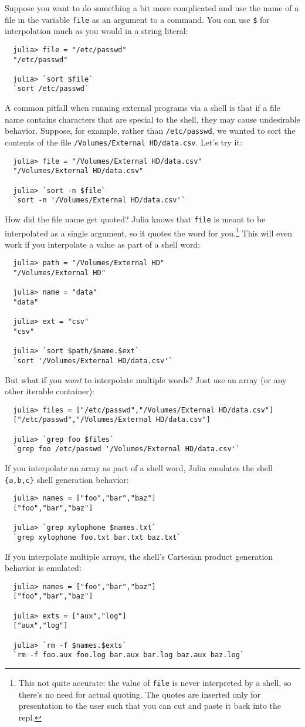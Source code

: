 \documentclass{article}
\begin{document}
Suppose you want to do something a bit more complicated and use the name of a file in the variable \verb|file| as an argument to a command.
You can use \verb|$| for interpolation much as you would in a string literal:
\begin{verbatim}
  julia> file = "/etc/passwd"
  "/etc/passwd"

  julia> `sort $file`
  `sort /etc/passwd`
\end{verbatim}
A common pitfall when running external programs via a shell is that if a file name contains characters that are special to the shell, they may cause undesirable behavior.
Suppose, for example, rather than \verb|/etc/passwd|, we wanted to sort the contents of the file \verb|/Volumes/External HD/data.csv|.
Let's try it:
\begin{verbatim}
  julia> file = "/Volumes/External HD/data.csv"
  "/Volumes/External HD/data.csv"

  julia> `sort -n $file`
  `sort -n '/Volumes/External HD/data.csv'`
\end{verbatim}
How did the file name get quoted?
Julia knows that \verb|file| is meant to be interpolated as a single argument, so it quotes the word for you.\footnote{This not quite accurate:
the value of \texttt{file} is never interpreted by a shell, so there's no need for actual quoting.
The quotes are inserted only for presentation to the user such that you can cut and paste it back into the repl.}
This will even work if you interpolate a value as part of a shell word:
\begin{verbatim}
  julia> path = "/Volumes/External HD"
  "/Volumes/External HD"

  julia> name = "data"
  "data"

  julia> ext = "csv"
  "csv"

  julia> `sort $path/$name.$ext`
  `sort '/Volumes/External HD/data.csv'`
\end{verbatim}
But what if you \emph{want} to interpolate multiple words?
Just use an array (or any other iterable container):
\begin{verbatim}
  julia> files = ["/etc/passwd","/Volumes/External HD/data.csv"]
  ["/etc/passwd","/Volumes/External HD/data.csv"]

  julia> `grep foo $files`
  `grep foo /etc/passwd '/Volumes/External HD/data.csv'`
\end{verbatim}
If you interpolate an array as part of a shell word, Julia emulates the shell \verb|{a,b,c}| shell generation behavior:
\begin{verbatim}
  julia> names = ["foo","bar","baz"]
  ["foo","bar","baz"]

  julia> `grep xylophone $names.txt`
  `grep xylophone foo.txt bar.txt baz.txt`
\end{verbatim}
If you interpolate multiple arrays, the shell's Cartesian product generation behavior is emulated:
\begin{verbatim}
  julia> names = ["foo","bar","baz"]
  ["foo","bar","baz"]

  julia> exts = ["aux","log"]
  ["aux","log"]

  julia> `rm -f $names.$exts`
  `rm -f foo.aux foo.log bar.aux bar.log baz.aux baz.log`
\end{verbatim}
\end{document}
